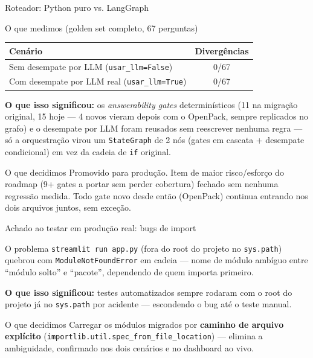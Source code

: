 \documentclass{beamer}
\newenvironment{numerobloco}[1]{\begin{block}{#1}}{\end{block}}
\newenvironment{decisaobloco}[1]{\begin{alertblock}{#1}}{\end{alertblock}}
\begin{document}
\begin{frame}{Roteador: Python puro vs. LangGraph}
  \small
  \begin{numerobloco}{O que medimos (golden set completo, 67 perguntas)}
    \begin{center}
    \begin{tabular}{lc}
      \toprule
      \textbf{Cenário} & \textbf{Divergências} \\
      \midrule
      Sem desempate por LLM (\texttt{usar\_llm=False}) & 0/67 \\
      Com desempate por LLM real (\texttt{usar\_llm=True}) & 0/67 \\
      \bottomrule
    \end{tabular}
    \end{center}
  \end{numerobloco}

  \pause
  \textbf{O que isso significou:} os \emph{answerability gates} determinísticos (11 na
  migração original, 15 hoje — 4 novos vieram depois com o OpenPack, sempre replicados no
  grafo) e o desempate por LLM foram reusados sem reescrever nenhuma regra — só a
  orquestração virou um \texttt{StateGraph} de 2 nós (gates em cascata + desempate
  condicional) em vez da cadeia de \texttt{if} original.

  \pause
  \begin{decisaobloco}{O que decidimos}
    Promovido para produção. Item de maior risco/esforço do roadmap (9+ gates a portar sem
    perder cobertura) fechado sem nenhuma regressão medida. Todo gate novo desde então
    (OpenPack) continua entrando nos dois arquivos juntos, sem exceção.
  \end{decisaobloco}
\end{frame}

\begin{frame}{Achado ao testar em produção real: bugs de import}
  \begin{numerobloco}{O problema}
    \small
    \texttt{streamlit run app.py} (fora do root do projeto no \texttt{sys.path}) quebrou
    com \texttt{ModuleNotFoundError} em cadeia — nome de módulo ambíguo entre ``módulo
    solto'' e ``pacote'', dependendo de quem importa primeiro.
  \end{numerobloco}

  \pause
  \textbf{O que isso significou:} testes automatizados sempre rodaram com o root do
  projeto já no \texttt{sys.path} por acidente — escondendo o bug até o teste manual.

  \pause
  \begin{decisaobloco}{O que decidimos}
    \small
    Carregar os módulos migrados por \textbf{caminho de arquivo explícito}
    (\texttt{importlib.util.spec\_from\_file\_location}) — elimina a ambiguidade,
    confirmado nos dois cenários e no dashboard ao vivo.
  \end{decisaobloco}
\end{frame}
\end{document}
